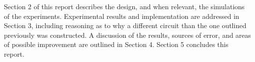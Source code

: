 \noindent Section 2 of this report describes the design, and when relevant, the simulations of the experiments. Experimental results and implementation are addressed in Section 3, including reasoning as to why a different circuit than the one outlined previously was constructed. A discussion of the results, sources of error, and areas of possible improvement are outlined in Section 4. Section 5 concludes this report. \newline

